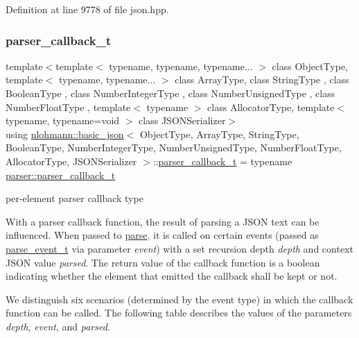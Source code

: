 Definition at line 9778 of file json.\+hpp.

\mbox{\label{classnlohmann_1_1basic__json_ab4f78c5f9fd25172eeec84482e03f5b7}} 
\subsubsection{\texorpdfstring{parser\+\_\+callback\+\_\+t}{parser\_callback\_t}}
{\footnotesize\ttfamily template$<$template$<$ typename, typename, typename... $>$ class Object\+Type, template$<$ typename, typename... $>$ class Array\+Type, class String\+Type , class Boolean\+Type , class Number\+Integer\+Type , class Number\+Unsigned\+Type , class Number\+Float\+Type , template$<$ typename $>$ class Allocator\+Type, template$<$ typename, typename=void $>$ class J\+S\+O\+N\+Serializer$>$ \\
using \hyperlink{classnlohmann_1_1basic__json}{nlohmann\+::basic\+\_\+json}$<$ Object\+Type, Array\+Type, String\+Type, Boolean\+Type, Number\+Integer\+Type, Number\+Unsigned\+Type, Number\+Float\+Type, Allocator\+Type, J\+S\+O\+N\+Serializer $>$\+::\hyperlink{classnlohmann_1_1basic__json_ab4f78c5f9fd25172eeec84482e03f5b7}{parser\+\_\+callback\+\_\+t} =  typename \hyperlink{classnlohmann_1_1detail_1_1parser_ad250ad4f2b4af4a497e727c963162ff1}{parser\+::parser\+\_\+callback\+\_\+t}}



per-\/element parser callback type 

With a parser callback function, the result of parsing a J\+S\+ON text can be influenced. When passed to \hyperlink{classnlohmann_1_1basic__json_aa9676414f2e36383c4b181fe856aa3c0}{parse}, it is called on certain events (passed as \hyperlink{classnlohmann_1_1basic__json_aaceba2e4cf75fc983bb75c78c8742e65}{parse\+\_\+event\+\_\+t} via parameter {\itshape event}) with a set recursion depth {\itshape depth} and context J\+S\+ON value {\itshape parsed}. The return value of the callback function is a boolean indicating whether the element that emitted the callback shall be kept or not.

We distinguish six scenarios (determined by the event type) in which the callback function can be called. The following table describes the values of the parameters {\itshape depth}, {\itshape event}, and {\itshape parsed}.

